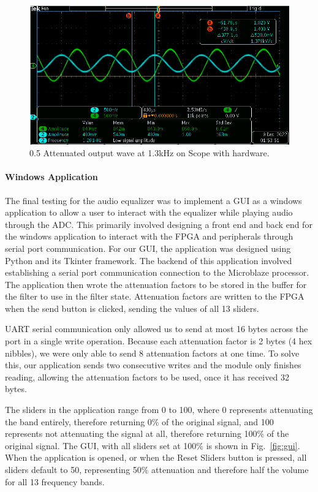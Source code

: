 \documentclass[journal]{IEEEtran} %
\begin{document}
\begin{figure}[htbp]
\centering
\includegraphics[width=0.9\linewidth]{Figures/EQ/half wave.PNG}
\caption{\label{fig:half}0.5 Attenuated output wave at 1.3kHz on Scope with hardware.}
\end{figure}

\paragraph{Windows Application} The final testing for the audio equalizer was to implement a GUI as a windows application to allow a user to interact with the equalizer while playing audio through the ADC. This primarily involved designing a front end and back end for the windows application to interact with the FPGA and peripherals through serial port communication. For our GUI, the application was designed using Python and its Tkinter framework. The backend of this application involved establishing a serial port communication connection to the Microblaze processor. The application then wrote the attenuation factors to be stored in the buffer for the filter to use in the filter state. Attenuation factors are written to the FPGA when the send button is clicked, sending the values of all 13 sliders.

UART serial communication only allowed us to send at most 16 bytes across the port in a single write operation. Because each attenuation factor is 2 bytes (4 hex nibbles), we were only able to send 8 attenuation factors at one time. To solve this, our application sends two consecutive writes and the module only finishes reading, allowing the attenuation factors to be used, once it has received 32 bytes.

The sliders in the application range from 0 to 100, where 0 represents attenuating the band entirely, therefore returning 0\% of the original signal, and 100 represents not attenuating the signal at all, therefore returning 100\% of the original signal. The GUI, with all sliders set at 100\% is shown in Fig.~\ref{fig:gui}. When the application is opened, or when the Reset Sliders button is pressed, all sliders default to 50, representing 50\% attenuation and therefore half the volume for all 13 frequency bands.
\end{document}
